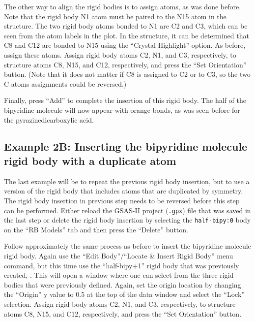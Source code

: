 The other way to align the rigid bodies is to assign atoms, as was done before.
Note that the rigid body N1 atom must be paired to the N15 atom in the structure. The two rigid body atoms bonded to N1 are C2 and C3, which can be seen from the atom labels in the plot. In the structure, it can be determined that C8 and C12 are bonded to N15 using the ``Crystal Highlight'' option. As before, assign these atoms. Assign rigid body atoms C2, N1, and C3, respectively, to structure atoms C8, N15, and C12, respectively, and press the ``Set Orientation'' button. (Note that it does not matter if C8 is assigned to C2 or to C3, so the two C atoms assignments could be reversed.)

Finally, press ``Add'' to complete the insertion of this rigid body. The half of the bipyridine molecule will now appear with orange bonds, as was seen before for the pyrazinedicarboxylic acid. 

\subsection{Example 2B: Inserting the bipyridine molecule rigid body with a duplicate atom}
The last example will be to repeat the previous rigid body insertion, but to use a version of the rigid body that includes atoms that are duplicated by symmetry. The rigid body insertion in previous step needs to be reversed before this step can be performed. Either reload the GSAS-II project (\texttt{.gpx}) file that was saved in the last step or delete the rigid body insertion by selecting the \texttt{half-bipy:0} body on the ``RB Models'' tab and then press the ``Delete'' button. 

Follow approximately the same process as before to insert the bipyridine molecule rigid body. Again use the ``Edit Body''/``Locate \& Insert Rigid Body'' menu command, but this time use the ``half-bipy+1'' rigid body that was previously created, . This will open a window where one can select from the three rigid bodies that were previously defined. Again, set the origin location by changing the ``Origin'' y value to 0.5 at the top of the data window and select the ``Lock'' selection. Assign rigid body atoms C2, N1, and C3, respectively, to structure atoms C8, N15, and C12, respectively, and press the ``Set Orientation'' button. 

